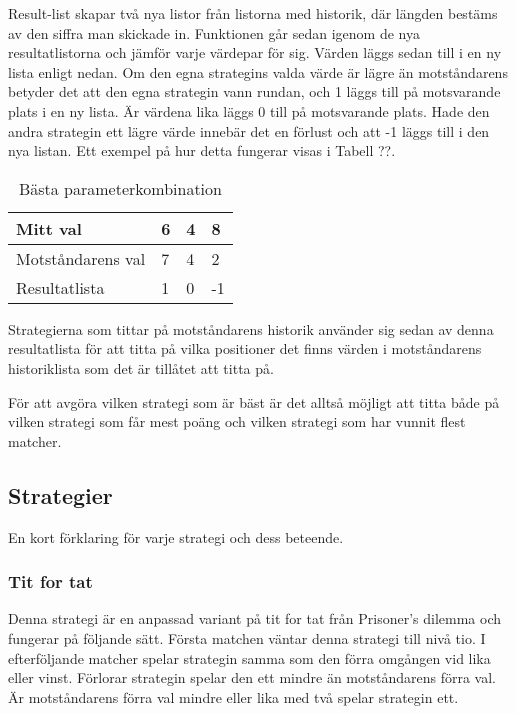 Result-list skapar två nya listor från listorna med historik, där längden bestäms av den siffra man skickade in. Funktionen går sedan igenom de nya resultatlistorna och jämför varje värdepar för sig. Värden läggs sedan till i en ny lista enligt nedan. Om den egna strategins valda värde är lägre än motståndarens betyder det att den egna strategin vann rundan, och 1 läggs till på motsvarande plats i en ny lista. Är värdena lika läggs 0 till på motsvarande plats. Hade den andra strategin ett lägre värde innebär det en förlust och att -1 läggs till i den nya listan. Ett exempel på hur detta fungerar visas i Tabell ??.

\begin{table}[h!]
	\begin{center}
		\begin{tabular}{| l | l | l | l |}
			\hline
			Mitt val & 6 & 4 & 8 \\ \hline
			Motståndarens val & 7 & 4 & 2 \\ \hline
			Resultatlista & 1 & 0 & -1 \\ \hline
		\end{tabular}
	\end{center}
	\caption{Bästa parameterkombination}
\end{table}

Strategierna som tittar på motståndarens historik använder sig sedan av denna resultatlista för att titta på vilka positioner det finns värden i motståndarens historiklista som det är tillåtet att titta på.

För att avgöra vilken strategi som är bäst är det alltså möjligt att titta både på vilken strategi som får mest poäng och vilken strategi som har vunnit flest matcher.

\subsection{Strategier}
En kort förklaring för varje strategi och dess beteende.

\subsubsection{Tit for tat}
Denna strategi är en anpassad variant på tit for tat från Prisoner’s dilemma och fungerar på följande sätt. Första matchen väntar denna strategi till nivå tio. I efterföljande matcher spelar strategin samma som den förra omgången vid lika eller vinst. Förlorar strategin spelar den ett mindre än motståndarens förra val. Är motståndarens förra val mindre eller lika med två spelar strategin ett.

